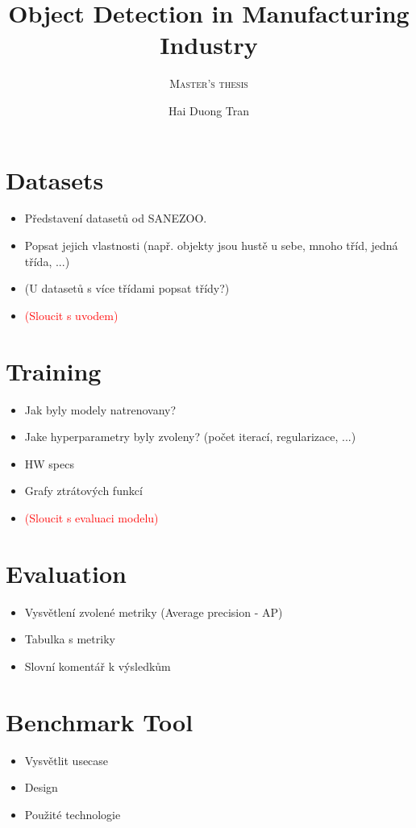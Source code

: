 \documentclass{mimosis}
\title{Object Detection in Manufacturing Industry}
\subtitle{\textsc{Master's thesis}}
\author{Hai Duong Tran}
\newcommand{\todo}[1]{\textcolor{red}{(#1)}}
\begin{document}
\frontmatter
%   
%   
%   
%   
  \tableofcontents

\mainmatter

    \let\cleardoublepage\clearpage
  
  
    

    

\chapter{Datasets}
\begin{itemize}
\item Představení datasetů od SANEZOO.
\item Popsat jejich vlastnosti (např. objekty jsou hustě u sebe, mnoho tříd, jedná třída, ...)
\item (U datasetů s více třídami popsat třídy?)
\item \todo{Sloucit s uvodem}
\end{itemize}




\chapter{Training}
\begin{itemize}
\item Jak byly modely natrenovany?
\item Jake hyperparametry byly zvoleny? (počet iterací, regularizace, ...)
\item HW specs
\item Grafy ztrátových funkcí
\item \todo{Sloucit s evaluaci modelu}
\end{itemize}

\chapter{Evaluation}
\begin{itemize}
\item Vysvětlení zvolené metriky (Average precision - AP)
\item Tabulka s metriky
\item Slovní komentář k výsledkům
\end{itemize}

\chapter{Benchmark Tool}
\begin{itemize}
\item Vysvětlit usecase
\item Design 
\item Použité technologie
\end{itemize}
\end{document}
